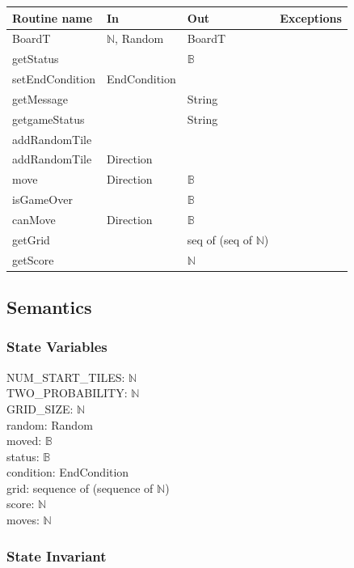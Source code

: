 \documentclass[12pt]{article}
\begin{document}
\begin{tabular}{| l | l | l | l |}
\hline
\textbf{Routine name} & \textbf{In} & \textbf{Out} & \textbf{Exceptions}\\
\hline
BoardT & $\mathbb{N}$, Random & BoardT & \\
\hline
getStatus & ~ & $\mathbb{B}$ & \\
\hline
setEndCondition & EndCondition &  & \\
\hline
getMessage & ~ & String & \\
\hline
getgameStatus &  & String & \\
\hline
addRandomTile &  &  & \\
\hline
addRandomTile  &  Direction  &  & \\
\hline
move  & Direction  & $\mathbb{B}$ & \\
\hline
isGameOver  &   & $\mathbb{B}$ & \\
\hline
canMove  & Direction  &  $\mathbb{B}$ & \\
\hline
getGrid  &  &  seq of (seq of $\mathbb{N}$) & \\
\hline
getScore  &  &  $\mathbb{N}$ & \\
\hline
\end{tabular}

\subsection* {Semantics}

\subsubsection* {State Variables}

NUM\_START\_TILES: $\mathbb{N}$ \\
TWO\_PROBABILITY: $\mathbb{N}$ \\
GRID\_SIZE: $\mathbb{N}$\\
random: Random\\
moved: $\mathbb{B}$\\
status: $\mathbb{B}$\\
condition: EndCondition\\
grid: sequence of (sequence of $\mathbb{N}$)\\
score: $\mathbb{N}$\\
moves: $\mathbb{N}$\\

\subsubsection* {State Invariant}
\end{document}
